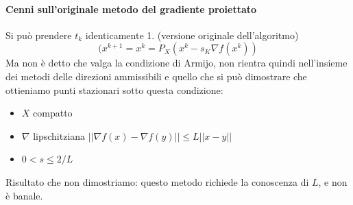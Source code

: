\paragraph{Cenni sull'originale metodo del gradiente proiettato}
Si pu\`o prendere $t_k$ identicamente 1. (versione originale dell'algoritmo)
$$(x^{k+1} = x^{k} = P_{X}(x^{k} - s_{K}\nabla f(x^{k}))$$
Ma non \`e detto che valga la condizione di Armijo,
non rientra quindi nell'insieme dei metodi delle direzioni
ammissibili e quello che si pu\`o dimostrare
che ottieniamo punti stazionari sotto questa condizione:

\begin{itemize}
\item $X$ compatto
\item $\nabla$ lipschitziana $|| \nabla f(x)  - \nabla f(y)|| \leq L ||x -y ||$
\item $ 0 < s \leq 2/L$
\end{itemize}
Risultato che non dimostriamo: questo metodo richiede la conoscenza
di $L$, e non \`e banale.




\outbpdocument
